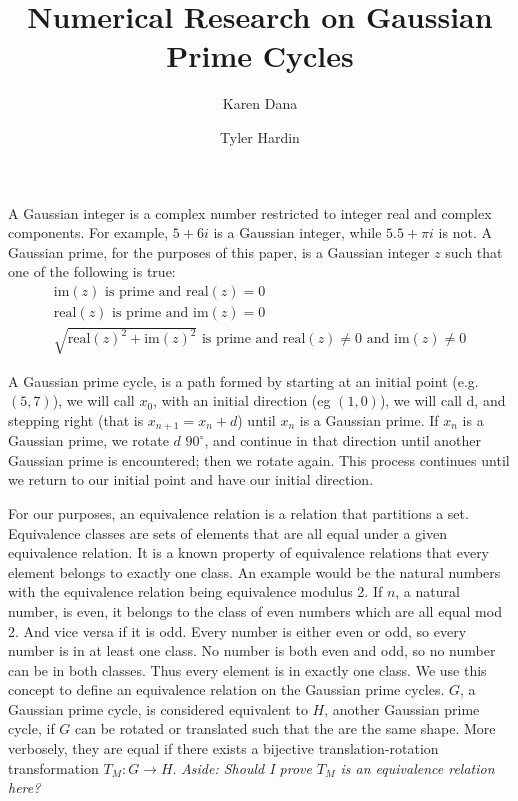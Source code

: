 \documentclass{article}
\title{Numerical Research on Gaussian Prime Cycles}
\author{Karen Dana \and Tyler Hardin}
\begin{document}
	\maketitle
	
A Gaussian integer is a complex number restricted to integer real and complex components. For example, $5+6i$ is a Gaussian integer, while $5.5+\pi i$ is not. A Gaussian prime, for the purposes of this paper, is a Gaussian integer $z$ such that one of the following is true:
\begin{gather*}
  \mbox{im}(z) \mbox{ is prime and } \mbox{real}(z) = 0 \\
  \mbox{real}(z) \mbox{ is prime and } \mbox{im}(z) = 0 \\
  \sqrt{\mbox{real}(z)^2 + \mbox{im}(z)^2} \mbox{ is prime and } \mbox{real}(z) \neq 0 \mbox{ and } \mbox{im}(z) \neq 0
\end{gather*}
  
A Gaussian prime cycle, is a path formed by starting at an initial point (e.g. $(5,7)$), we will call $x_0$, with an initial direction (eg $(1,0)$), we will call d, and stepping right (that is $x_{n+1}=x_n + d$) until $x_n$ is a Gaussian prime. If $x_n$ is a Gaussian prime, we rotate $d$ $90^{\circ}$, and continue in that direction until another Gaussian prime is encountered; then we rotate again. This process continues until we return to our initial point and have our initial direction.

For our purposes, an equivalence relation is a relation that partitions a set. 
Equivalence classes are sets of elements that are all equal under a given equivalence relation. It is a known property of equivalence relations that every element belongs to exactly one class.
An example would be the natural numbers with the equivalence relation being equivalence modulus 2.
If $n$, a natural number, is even, it belongs to the class of even numbers which are all equal mod 2.
And vice versa if it is odd. Every number is either even or odd, so every number is in at least one class. No number is both even and odd, so no number can be in both classes. Thus every element is in exactly one class.
We use this concept to define an equivalence relation on the Gaussian prime cycles.
$G$, a Gaussian prime cycle, is considered equivalent to $H$, another Gaussian prime cycle, if $G$ can be rotated or translated such that the are the same shape.
More verbosely, they are equal if there exists a bijective translation-rotation transformation $T_M:G \to H$. \textit{Aside: Should I prove $T_M$ is an equivalence relation here?}
\end{document}
